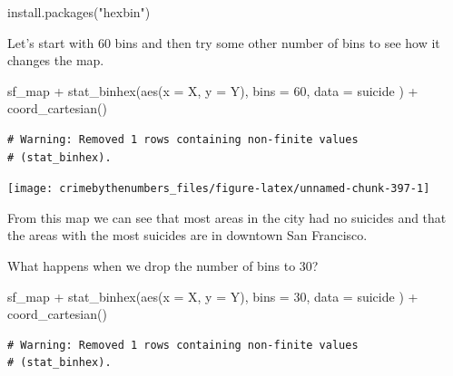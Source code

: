 \documentclass[
]{krantz}
\makeatletter
\newenvironment{Shaded}{\begin{snugshade}}{\end{snugshade}}
\newcommand{\AttributeTok}[1]{\textcolor[rgb]{0.61,0.61,0.61}{#1}}
\newcommand{\DecValTok}[1]{\textcolor[rgb]{0.06,0.06,0.06}{#1}}
\newcommand{\FunctionTok}[1]{\textcolor[rgb]{0,0,0}{#1}}
\newcommand{\NormalTok}[1]{#1}
\newcommand{\SpecialCharTok}[1]{\textcolor[rgb]{0,0,0}{#1}}
\newcommand{\StringTok}[1]{\textcolor[rgb]{0.5,0.5,0.5}{#1}}
\newenvironment{kframe}{%
\medskip{}
\setlength{\fboxsep}{.8em}
 \def\at@end@of@kframe{}%
 \ifinner\ifhmode%
  \def\at@end@of@kframe{\end{minipage}}%
  \begin{minipage}{\columnwidth}%
 \fi\fi%
 \def\FrameCommand##1{\hskip\@totalleftmargin \hskip-\fboxsep
 \colorbox{shadecolor}{##1}\hskip-\fboxsep
     \hskip-\linewidth \hskip-\@totalleftmargin \hskip\columnwidth}%
 \MakeFramed {\advance\hsize-\width
   \@totalleftmargin\z@ \linewidth\hsize
   \@setminipage}}%
 {\par\unskip\endMakeFramed%
 \at@end@of@kframe}
\renewenvironment{Shaded}{\begin{kframe}}{\end{kframe}}
\makeatother
\begin{document}
\begin{Shaded}
\begin{Highlighting}[]
\FunctionTok{install.packages}\NormalTok{(}\StringTok{"hexbin"}\NormalTok{)}
\end{Highlighting}
\end{Shaded}

Let's start with 60 bins and then try some other number of
bins to see how it changes the map.

\begin{Shaded}
\begin{Highlighting}[]
\NormalTok{sf\_map }\SpecialCharTok{+}
  \FunctionTok{stat\_binhex}\NormalTok{(}\FunctionTok{aes}\NormalTok{(}\AttributeTok{x =}\NormalTok{ X, }\AttributeTok{y =}\NormalTok{ Y),}
    \AttributeTok{bins =} \DecValTok{60}\NormalTok{,}
    \AttributeTok{data =}\NormalTok{ suicide}
\NormalTok{  ) }\SpecialCharTok{+}
  \FunctionTok{coord\_cartesian}\NormalTok{()}
\end{Highlighting}
\end{Shaded}

\begin{verbatim}
# Warning: Removed 1 rows containing non-finite values
# (stat_binhex).
\end{verbatim}

\begin{center}\texttt{[image: crimebythenumbers\_files/figure-latex/unnamed-chunk-397-1]} \end{center}

From this map we can see that most areas in the city had no
suicides and that the areas with the most suicides are in
downtown San Francisco.

What happens when we drop the number of bins to 30?

\begin{Shaded}
\begin{Highlighting}[]
\NormalTok{sf\_map }\SpecialCharTok{+}
  \FunctionTok{stat\_binhex}\NormalTok{(}\FunctionTok{aes}\NormalTok{(}\AttributeTok{x =}\NormalTok{ X, }\AttributeTok{y =}\NormalTok{ Y),}
    \AttributeTok{bins =} \DecValTok{30}\NormalTok{,}
    \AttributeTok{data =}\NormalTok{ suicide}
\NormalTok{  ) }\SpecialCharTok{+}
  \FunctionTok{coord\_cartesian}\NormalTok{()}
\end{Highlighting}
\end{Shaded}

\begin{verbatim}
# Warning: Removed 1 rows containing non-finite values
# (stat_binhex).
\end{verbatim}
\end{document}
